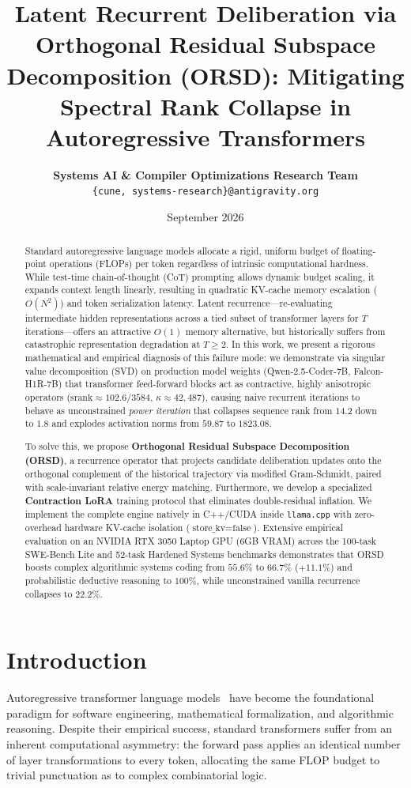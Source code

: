 \documentclass[11pt,a4paper]{article}
\title{\textbf{Latent Recurrent Deliberation via Orthogonal Residual Subspace Decomposition (ORSD): Mitigating Spectral Rank Collapse in Autoregressive Transformers}}
\author{
  \textbf{Systems AI \& Compiler Optimizations Research Team} \\
  \texttt{\{cune, systems-research\}@antigravity.org}
}
\date{September 2026}
\theoremstyle{plain}
\theoremstyle{definition}
\theoremstyle{remark}
\begin{document}
\maketitle

\begin{abstract}
Standard autoregressive language models allocate a rigid, uniform budget of floating-point operations (FLOPs) per token regardless of intrinsic computational hardness. While test-time chain-of-thought (CoT) prompting allows dynamic budget scaling, it expands context length linearly, resulting in quadratic KV-cache memory escalation ($O(N^2)$) and token serialization latency. Latent recurrence---re-evaluating intermediate hidden representations across a tied subset of transformer layers for $T$ iterations---offers an attractive $O(1)$ memory alternative, but historically suffers from catastrophic representation degradation at $T \ge 2$. In this work, we present a rigorous mathematical and empirical diagnosis of this failure mode: we demonstrate via singular value decomposition (SVD) on production model weights (Qwen-2.5-Coder-7B, Falcon-H1R-7B) that transformer feed-forward blocks act as contractive, highly anisotropic operators ($\text{srank} \approx 102.6 / 3584$, $\kappa \approx 42{,}487$), causing naive recurrent iterations to behave as unconstrained \textit{power iteration} that collapses sequence rank from $14.2$ down to $1.8$ and explodes activation norms from $59.87$ to $1823.08$. 

To solve this, we propose \textbf{Orthogonal Residual Subspace Decomposition (ORSD)}, a recurrence operator that projects candidate deliberation updates onto the orthogonal complement of the historical trajectory via modified Gram-Schmidt, paired with scale-invariant relative energy matching. Furthermore, we develop a specialized \textbf{Contraction LoRA} training protocol that eliminates double-residual inflation. We implement the complete engine natively in C++/CUDA inside \texttt{llama.cpp} with zero-overhead hardware KV-cache isolation ($\text{store\_kv}=\text{false}$). Extensive empirical evaluation on an NVIDIA RTX 3050 Laptop GPU (6GB VRAM) across the 100-task SWE-Bench Lite and 52-task Hardened Systems benchmarks demonstrates that ORSD boosts complex algorithmic systems coding from $55.6\%$ to $66.7\%$ ($+11.1\%$) and probabilistic deductive reasoning to $100\%$, while unconstrained vanilla recurrence collapses to $22.2\%$.
\end{abstract}

\section{Introduction}
Autoregressive transformer language models~\cite{vaswani2017attention} have become the foundational paradigm for software engineering, mathematical formalization, and algorithmic reasoning. Despite their empirical success, standard transformers suffer from an inherent computational asymmetry: the forward pass applies an identical number of layer transformations to every token, allocating the same FLOP budget to trivial punctuation as to complex combinatorial logic.
\end{document}
